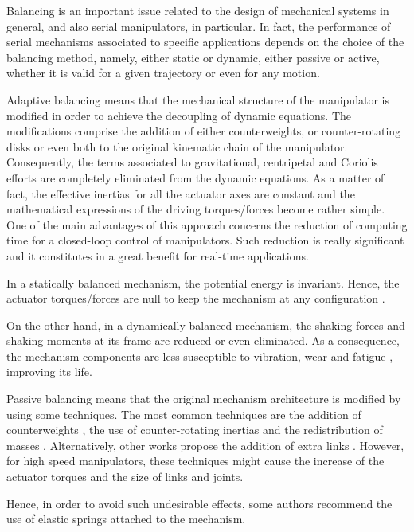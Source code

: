 \documentclass[a4paper,11pt,brazil,fleqn]{article}
\begin{document}
Balancing is an important issue related to the design of mechanical systems in general, and also serial manipulators, in particular. In fact, the performance of serial mechanisms associated to specific applications depends on the choice of the balancing method, namely, either static or dynamic, either passive or active, whether it is valid for a given trajectory or even for any motion.

Adaptive balancing means that the mechanical structure of the manipulator is modified in order to achieve the decoupling of dynamic equations. The modifications comprise the addition of either counterweights, or counter-rotating disks or even both to the original kinematic chain of the manipulator. Consequently, the terms associated to gravitational, centripetal and Coriolis efforts are completely eliminated from the dynamic equations. As a matter of fact, the effective inertias for all the actuator axes are constant and the mathematical expressions of the driving torques/forces become rather simple. One of the main advantages of this approach concerns the reduction of computing time for a closed-loop control of manipulators. Such reduction is really significant and it constitutes in a great benefit for real-time applications.

In a statically balanced mechanism, the potential energy is invariant. Hence,
the actuator torques/forces are null to keep the mechanism at any configuration \cite{6wang}.

On the other hand, in a dynamically balanced mechanism, the shaking forces and
shaking moments at its frame are reduced or even eliminated. As a consequence, 
the mechanism components are less susceptible to vibration, wear and fatigue \cite{4wu}, improving its life.

Passive balancing means that the original mechanism architecture is modified by using some techniques. The most common techniques are
the addition of counterweights \cite{1wijk,2arakelian,3seo,4wu,6wang,7wang,12russo,15coelho,16moradi}, 
the use of counter-rotating inertias \cite{2arakelian,4wu,15coelho,16moradi} 
and the redistribution of masses \cite{8alici,9alici}. Alternatively, other works propose the addition of extra links \cite{5gosselin,12russo,13agrawal}.
However, for high speed manipulators, these techniques might cause the increase of the actuator torques and the size of links and joints.

Hence, in order to avoid such undesirable effects, some 
authors \cite{6wang,7wang,8alici,9alici,10dehkordi,13agrawal} recommend the use of  elastic springs attached to the mechanism.
\end{document}
